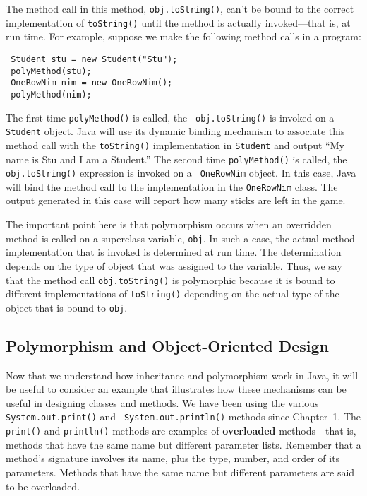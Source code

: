 \noindent The method call in this method, {\tt obj.toString()}, can't
be bound to the correct implementation of {\tt toString()} until the
method is actually invoked---that is, at run time.  For example,
suppose we make the following method calls in a program:

\begin{jjjlisting}
\begin{lstlisting}
 Student stu = new Student("Stu");
 polyMethod(stu);
 OneRowNim nim = new OneRowNim();
 polyMethod(nim);  
\end{lstlisting}
\end{jjjlisting}

\noindent The first time {\tt polyMethod()} is called, the {\tt
obj.toString()} is invoked on a {\tt Student} object.  Java will use
its dynamic binding mechanism to associate this method call with the
{\tt toString()} implementation in {\tt Student} and output ``My name
is Stu and I am a Student.''  The second time {\tt polyMethod()} is
called, the {\tt obj.toString()} expression is invoked on a {\tt
OneRowNim} object. In this case, Java will bind the method call to the
implementation in the {\tt OneRowNim} class. The output generated in
this case will report how many sticks are left in the game. 

The important point here is that polymorphism occurs when an
overridden method is called on a superclass variable, {\tt obj}. In
such a case, the actual method implementation that is invoked is
determined at run time.  The determination depends on the type of
object that was assigned to the variable.  Thus, we say that the
method call {\tt obj.toString()} is polymorphic because it is bound to
different implementations of {\tt toString()} depending on the actual
type of the object that is bound to {\tt obj}.


\subsection{Polymorphism and Object-Oriented Design}

Now that we understand how inheritance and polymorphism work in Java,
it will be useful to consider an example that illustrates how these
mechanisms can be useful in designing classes and methods.  We have
been using the various {\tt System.out.print()} and {\tt
System.out.println()} methods since Chapter~1.  The {\tt print()} and
{\tt println()} methods are examples of {\bf overloaded}
methods---that is, methods that have the same name but different
parameter lists.  Remember that a method's signature involves its
name, plus the type, number, and order of its parameters. Methods that
have the same name but different parameters are said to be overloaded.

